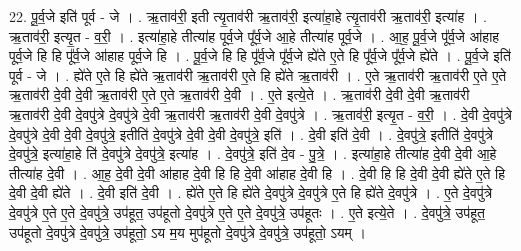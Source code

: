 \documentclass[17pt]{extarticle}
\begin{document}
22. पू॒र्व॒जे इति॑ पूर्व - जे । . ऋ॒ताव॑री॒ इती त्यृ॒ताव॑री ऋ॒ताव॑री॒ इत्या॑हा॒हे त्यृ॒ताव॑री ऋ॒ताव॑री॒ इत्या॑ह । . ऋ॒ताव॑री॒ इत्यृ॒त - व॒री॒ । . इत्या॑हा॒हे तीत्या॑ह पूर्व॒जे पू᳚र्व॒जे आ॒हे तीत्या॑ह पूर्व॒जे । . आ॒ह॒ पू॒र्व॒जे पू᳚र्व॒जे आ॑हाह पूर्व॒जे हि हि पू᳚र्व॒जे आ॑हाह पूर्व॒जे हि । . पू॒र्व॒जे हि हि पू᳚र्व॒जे पू᳚र्व॒जे ह्ये॑ते ए॒ते हि पू᳚र्व॒जे पू᳚र्व॒जे ह्ये॑ते । . पू॒र्व॒जे इति॑ पूर्व - जे । . ह्ये॑ते ए॒ते हि ह्ये॑ते ऋ॒ताव॑री ऋ॒ताव॑री ए॒ते हि ह्ये॑ते ऋ॒ताव॑री । . ए॒ते ऋ॒ताव॑री ऋ॒ताव॑री ए॒ते ए॒ते ऋ॒ताव॑री दे॒वी दे॒वी ऋ॒ताव॑री ए॒ते ए॒ते ऋ॒ताव॑री दे॒वी । . ए॒ते इत्ये॒ते । . ऋ॒ताव॑री दे॒वी दे॒वी ऋ॒ताव॑री ऋ॒ताव॑री दे॒वी दे॒वपु॑त्रे दे॒वपु॑त्रे दे॒वी ऋ॒ताव॑री ऋ॒ताव॑री दे॒वी दे॒वपु॑त्रे । . ऋ॒ताव॑री॒ इत्यृ॒त - व॒री॒ । . दे॒वी दे॒वपु॑त्रे दे॒वपु॑त्रे दे॒वी दे॒वी दे॒वपु॑त्रे॒ इतीति॑ दे॒वपु॑त्रे दे॒वी दे॒वी दे॒वपु॑त्रे॒ इति॑ । . दे॒वी इति॑ दे॒वी । . दे॒वपु॑त्रे॒ इतीति॑ दे॒वपु॑त्रे दे॒वपु॑त्रे॒ इत्या॑हा॒हे ति॑ दे॒वपु॑त्रे दे॒वपु॑त्रे॒ इत्या॑ह । . दे॒वपु॑त्रे॒ इति॑ दे॒व - पु॒त्रे॒ । . इत्या॑हा॒हे तीत्या॑ह दे॒वी दे॒वी आ॒हे तीत्या॑ह दे॒वी । . आ॒ह॒ दे॒वी दे॒वी आ॑हाह दे॒वी हि हि दे॒वी आ॑हाह दे॒वी हि । . दे॒वी हि हि दे॒वी दे॒वी ह्ये॑ते ए॒ते हि दे॒वी दे॒वी ह्ये॑ते । . दे॒वी इति॑ दे॒वी । . ह्ये॑ते ए॒ते हि ह्ये॑ते दे॒वपु॑त्रे दे॒वपु॑त्रे ए॒ते हि ह्ये॑ते दे॒वपु॑त्रे । . ए॒ते दे॒वपु॑त्रे दे॒वपु॑त्रे ए॒ते ए॒ते दे॒वपु॑त्रे॒ उप॑हूत॒ उप॑हूतो दे॒वपु॑त्रे ए॒ते ए॒ते दे॒वपु॑त्रे॒ उप॑हूतः । . ए॒ते इत्ये॒ते । . दे॒वपु॑त्रे॒ उप॑हूत॒ उप॑हूतो दे॒वपु॑त्रे दे॒वपु॑त्रे॒ उप॑हूतो॒ ऽय म॒य मुप॑हूतो दे॒वपु॑त्रे दे॒वपु॑त्रे॒ उप॑हूतो॒ ऽयम् । \newline
\end{document}
